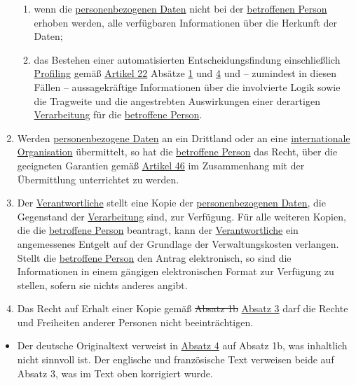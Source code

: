 \begin{enumerate}
\begin{enumerate}
    \item wenn die \hyperref[itm:04-1]{personenbezogenen Daten} nicht bei der \hyperref[itm:04-1]{betroffenen Person} erhoben werden, alle verfügbaren
     Informationen über die Herkunft der Daten;
    \label{itm:15-1g}

    \item das Bestehen einer automatisierten Entscheidungsfindung einschließlich \hyperref[itm:04-4]{Profiling} gemäß \hyperref[ch:22]
     {Artikel 22} Absätze \hyperref[itm:22-1]{1} und \hyperref[itm:22-4]{4} und -- zumindest in diesen Fällen --
     aussagekräftige Informationen über die involvierte Logik sowie die Tragweite und die angestrebten Auswirkungen
     einer derartigen \hyperref[itm:04-2]{Verarbeitung} für die \hyperref[itm:04-1]{betroffene Person}.
    \label{itm:15-1h}

  \end{enumerate}

  \item Werden \hyperref[itm:04-1]{personenbezogene Daten} an ein Drittland oder an eine \hyperref[itm:04-29]{internationale Organisation} übermittelt, so hat die
   \hyperref[itm:04-1]{betroffene Person} das Recht, über die geeigneten Garantien gemäß \hyperref[ch:46]{Artikel 46} im Zusammenhang mit der
   Übermittlung unterrichtet zu werden.
  \label{itm:15-2}

  \item Der \hyperref[itm:04-7]{Verantwortliche} stellt eine Kopie der \hyperref[itm:04-1]{personenbezogenen Daten}, die Gegenstand der \hyperref[itm:04-2]{Verarbeitung} sind, zur
   Verfügung. Für alle weiteren Kopien, die die \hyperref[itm:04-1]{betroffene Person} beantragt, kann der \hyperref[itm:04-7]{Verantwortliche} ein angemessenes
   Entgelt auf der Grundlage der Verwaltungskosten verlangen. Stellt die \hyperref[itm:04-1]{betroffene Person} den Antrag elektronisch, so
   sind die Informationen in einem gängigen elektronischen Format zur Verfügung zu stellen, sofern sie nichts anderes
   angibt.
  \label{itm:15-3}

  \item Das Recht auf Erhalt einer Kopie gemäß \sout{Absatz 1b} \hyperref[itm:15-3]{Absatz 3} darf die Rechte und
   Freiheiten anderer Personen nicht beeinträchtigen.
  \label{itm:15-4}

\end{enumerate}


\begin{itemize}

  \item Der deutsche Originaltext verweist in \hyperref[itm:15-4]{Absatz 4} auf Absatz 1b, was inhaltlich nicht sinnvoll
   ist. Der englische und französische Text verweisen beide auf Absatz 3, was im Text oben korrigiert wurde.

\end{itemize}

